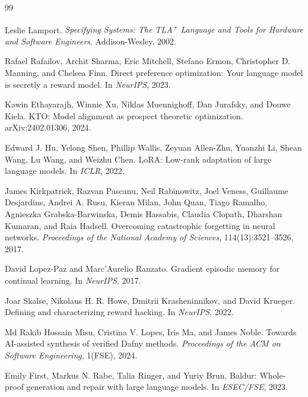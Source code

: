 \documentclass[11pt]{article}
\begin{document}

\begin{thebibliography}{99}

Leslie Lamport.
\newblock \emph{Specifying Systems: The TLA\textsuperscript{+} Language and
Tools for Hardware and Software Engineers}.
\newblock Addison-Wesley, 2002.

Rafael Rafailov, Archit Sharma, Eric Mitchell, Stefano Ermon,
Christopher D. Manning, and Chelsea Finn.
\newblock Direct preference optimization: Your language model is
secretly a reward model.
\newblock In \emph{NeurIPS}, 2023.

Kawin Ethayarajh, Winnie Xu, Niklas Muennighoff, Dan Jurafsky, and
Douwe Kiela.
\newblock KTO: Model alignment as prospect theoretic optimization.
\newblock arXiv:2402.01306, 2024.

Edward J. Hu, Yelong Shen, Phillip Wallis, Zeyuan Allen-Zhu, Yuanzhi
Li, Shean Wang, Lu Wang, and Weizhu Chen.
\newblock LoRA: Low-rank adaptation of large language models.
\newblock In \emph{ICLR}, 2022.

James Kirkpatrick, Razvan Pascanu, Neil Rabinowitz, Joel Veness,
Guillaume Desjardins, Andrei A. Rusu, Kieran Milan, John Quan,
Tiago Ramalho, Agnieszka Grabska-Barwinska, Demis Hassabis, Claudia
Clopath, Dharshan Kumaran, and Raia Hadsell.
\newblock Overcoming catastrophic forgetting in neural networks.
\newblock \emph{Proceedings of the National Academy of Sciences},
114(13):3521--3526, 2017.

David Lopez-Paz and Marc'Aurelio Ranzato.
\newblock Gradient episodic memory for continual learning.
\newblock In \emph{NeurIPS}, 2017.

Joar Skalse, Nikolaus H. R. Howe, Dmitrii Krasheninnikov, and David
Krueger.
\newblock Defining and characterizing reward hacking.
\newblock In \emph{NeurIPS}, 2022.

Md Rakib Hossain Misu, Cristina V. Lopes, Iris Ma, and James Noble.
\newblock Towards AI-assisted synthesis of verified Dafny methods.
\newblock \emph{Proceedings of the ACM on Software Engineering},
1(FSE), 2024.

Emily First, Markus N. Rabe, Talia Ringer, and Yuriy Brun.
\newblock Baldur: Whole-proof generation and repair with large
language models.
\newblock In \emph{ESEC/FSE}, 2023.

\end{thebibliography}
\end{document}
